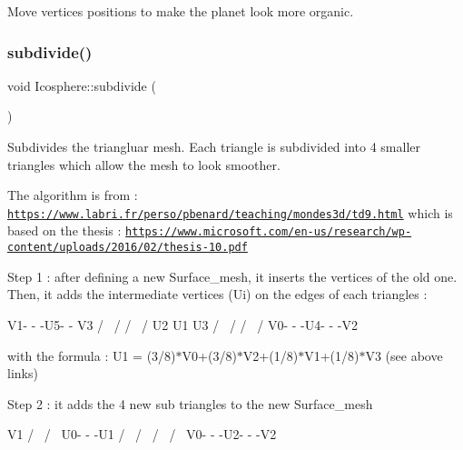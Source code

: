 Move vertices positions to make the planet look more organic. 

\mbox{\label{class_icosphere_a1086e13d1300ed79bf201d2570eb7ebe}} 
\subsubsection{\texorpdfstring{subdivide()}{subdivide()}}
{\footnotesize\ttfamily void Icosphere\+::subdivide (\begin{DoxyParamCaption}{ }\end{DoxyParamCaption})\hspace{0.3cm}{\ttfamily [private]}}



Subdivides the triangluar mesh. Each triangle is subdivided into 4 smaller triangles which allow the mesh to look smoother. 

The algorithm is from \+: \href{https://www.labri.fr/perso/pbenard/teaching/mondes3d/td9.html}{\tt https\+://www.\+labri.\+fr/perso/pbenard/teaching/mondes3d/td9.\+html} which is based on the thesis \+: \href{https://www.microsoft.com/en-us/research/wp-content/uploads/2016/02/thesis-10.pdf}{\tt https\+://www.\+microsoft.\+com/en-\/us/research/wp-\/content/uploads/2016/02/thesis-\/10.\+pdf}

Step 1 \+: after defining a new Surface\+\_\+mesh, it inserts the vertices of the old one. Then, it adds the intermediate vertices (Ui) on the edges of each triangles \+: \begin{DoxyVerb}                V1- - -U5- - V3
               /  \         /
              /    \       /
             U2     U1    U3
            /        \   /
           /          \ /
         V0- - -U4- - -V2
\end{DoxyVerb}


with the formula \+: U1 = (3/8)$\ast$\+V0+(3/8)$\ast$\+V2+(1/8)$\ast$\+V1+(1/8)$\ast$\+V3 (see above links)

Step 2 \+: it adds the 4 new sub triangles to the new Surface\+\_\+mesh \begin{DoxyVerb}                          V1
                         /  \
                        /    \
                       U0- - -U1
                      /  \   / \
                     /    \ /   \
                   V0- - -U2- - -V2
\end{DoxyVerb}


